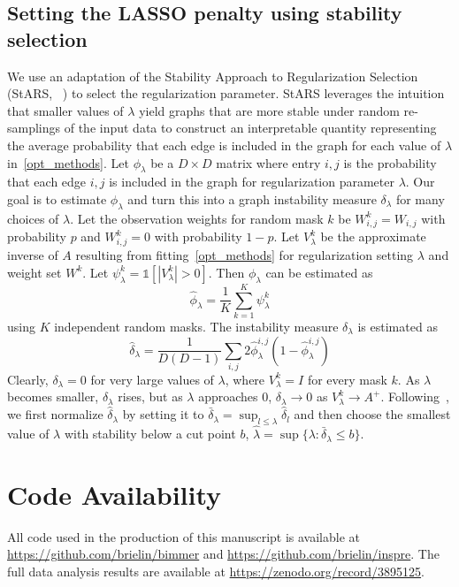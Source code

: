 \documentclass{article}
\begin{document}
\subsection{Setting the LASSO penalty using stability selection}
We use an adaptation of the Stability Approach to Regularization Selection (StARS, ~\cite{Liu2010})
to select the regularization parameter. StARS leverages the intuition that smaller values
of $\lambda$ yield graphs that are more stable under random re-samplings of the input data
to construct an interpretable quantity representing the average probability
that each edge is included in the graph for each value of $\lambda$ in~\eqref{opt_methods}.
Let $\phi_{\lambda}$ be a $D\times D$ matrix where entry $i, j$ is the probability that each edge
$i,j$ is included in the graph for regularization parameter $\lambda$.
Our goal is to estimate $\phi_{\lambda}$ and
turn this into a graph instability measure $\delta_\lambda$ for many choices of $\lambda$.
Let the observation weights for random mask $k$ be $W^k_{i,j} = W_{i,j}$ with probability $p$ and $W^k_{i,j} = 0$ with
probability $1-p$. Let $V_{\lambda}^k$ be the approximate inverse of
$A$ resulting from fitting~\eqref{opt_methods} for regularization setting
$\lambda$ and weight set $W^k$. Let $\psi^k_{\lambda} = \mathds{1}[|V^k_{\lambda}| > 0]$.
Then  $\phi_{\lambda}$ can be estimated as
\begin{equation}
\hat{\phi}_{\lambda} = \frac{1}{K} \sum_{k=1}^K \psi^{k}_{\lambda}
\end{equation}
using $K$ independent random masks.
The instability measure $\delta_\lambda$ is estimated as~\cite{Liu2010}
\begin{equation}
\hat{\delta}_\lambda = \frac{1}{D(D-1)} \sum_{i, j} 2 \hat{\phi}^{i, j}_\lambda(1-\hat{\phi}^{i, j}_\lambda)
\end{equation}
Clearly, $\delta_\lambda = 0$ for very large values of $\lambda$, where $V^k_\lambda = I$
for every mask $k$. As $\lambda$ becomes smaller, $\delta_\lambda$ rises,
 but as $\lambda$ approaches $0$,
$\delta_\lambda \rightarrow 0$ as $V^k_\lambda \rightarrow A^+$. Following~\cite{Liu2010},
we first normalize $\hat{\delta}_\lambda$ by setting it to
$\bar{\delta}_\lambda = \sup_{l \leq \lambda} \hat{\delta}_l$ and then choose the smallest
value of $\lambda$ with stability below a cut point $b$,
$\hat{\lambda} = \sup \{ \lambda : \bar{\delta}_\lambda \leq b \}$.

\section{Code Availability}
All code used in the production of this manuscript is available at \url{https://github.com/brielin/bimmer}
and \url{https://github.com/brielin/inspre}. The full data analysis results are available
at \url{https://zenodo.org/record/3895125}.
\end{document}
